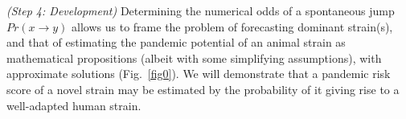\documentclass[onecolumn, compsoc,12pt]{IEEEtran}
\def\SUPPLEMENTARY{Supplementary\xspace}
\def\METHODS{Online Methods\xspace}
\def\EXTENDED{Extended Data\xspace}
\begin{document}
\textit{(Step 4: \bnd Development)} Determining the numerical odds of a spontaneous jump $ Pr(x \rightarrow y)$  allows us to frame the problem of forecasting  dominant strain(s), and that of estimating the  pandemic potential of an animal strain as  mathematical propositions (albeit with some simplifying assumptions), with  approximate solutions (Fig.~\ref{fig0}). %
We will demonstrate that a pandemic risk score of a novel strain may be estimated by the probability of it giving rise to a well-adapted human strain. %
%
%
%
%
%
%
\end{document}
